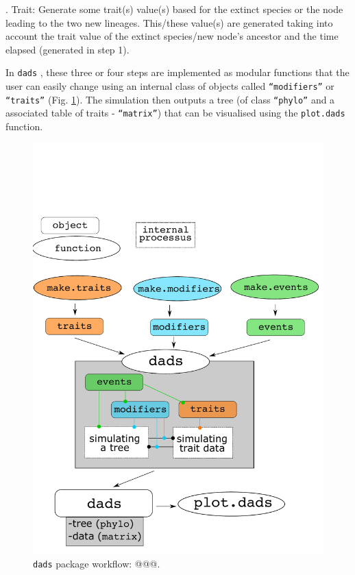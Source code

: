 \documentclass[12pt,letterpaper]{article}
\newcommand{\dads}{\texttt{dads} }
\begin{document}
. Trait: Generate some trait(s) value(s) based for the extinct species or the node leading to the two new lineages.
This/these value(s) are generated taking into account the trait value of the extinct species/new node's ancestor and the time elapsed (generated in step 1).

In \dads, these three or four steps are implemented as modular functions that the user can easily change using an internal class of objects called \texttt{``modifiers''} or \texttt{``traits''} (Fig. \ref{Fig:workflow}).
The simulation then outputs a tree (of class \texttt{``phylo''} and a associated table of traits - \texttt{``matrix''}) that can be visualised using the \texttt{plot.dads} function.

\begin{figure}[!htbp]
\centering
   \includegraphics[width=1\textwidth]{../inst/gitbook/dads_structure.pdf} 
\caption{\dads package workflow: @@@.}
\label{Fig:workflow}
\end{figure}
\end{document}

